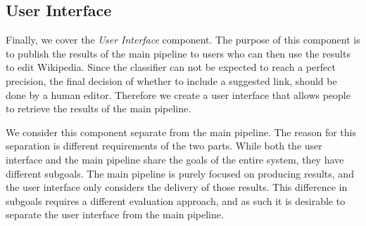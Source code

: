\subsection{User Interface}
Finally, we cover the \emph{User Interface} component. The purpose of this component is to publish the results of the main pipeline to users who can then use the results to edit Wikipedia. Since the classifier can not be expected to reach a perfect precision, the final decision of whether to include a suggested link, should be done by a human editor. Therefore we create a user interface that allows people to retrieve the results of the main pipeline.

We consider this component separate from the main pipeline. The reason for this separation is different requirements of the two parts. While both the user interface and the main pipeline share the goals of the entire system, they have different subgoals. The main pipeline is purely focused on producing results, and the user interface only considers the delivery of those results. This difference in subgoals requires a different evaluation approach, and as such it is desirable to separate the user interface from the main pipeline.










